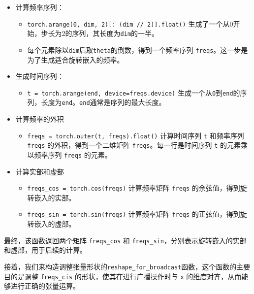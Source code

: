 \documentclass[12pt,a4paper]{book}
\begin{document}
\begin{itemize}
\tightlist
\item
  计算频率序列：

  \begin{itemize}
  \tightlist
  \item
    \texttt{torch.arange(0,\ dim,\ 2){[}:\ (dim\ //\ 2){]}.float()}
    生成了一个从0开始，步长为2的序列，其长度为\texttt{dim}的一半。
  \item
    每个元素除以\texttt{dim}后取\texttt{theta}的倒数，得到一个频率序列
    \texttt{freqs}。这一步是为了生成适合旋转嵌入的频率。
  \end{itemize}
\item
  生成时间序列：

  \begin{itemize}
  \tightlist
  \item
    \texttt{t\ =\ torch.arange(end,\ device=freqs.device)}
    生成一个从\texttt{0}到\texttt{end}的序列，长度为\texttt{end}。\texttt{end}通常是序列的最大长度。
  \end{itemize}
\item
  计算频率的外积

  \begin{itemize}
  \tightlist
  \item
    \texttt{freqs\ =\ torch.outer(t,\ freqs).float()} 计算时间序列
    \texttt{t} 和频率序列 \texttt{freqs} 的外积，得到一个二维矩阵
    \texttt{freqs}。每一行是时间序列 \texttt{t} 的元素乘以频率序列
    \texttt{freqs} 的元素。
  \end{itemize}
\item
  计算实部和虚部

  \begin{itemize}
  \tightlist
  \item
    \texttt{freqs\_cos\ =\ torch.cos(freqs)} 计算频率矩阵 \texttt{freqs}
    的余弦值，得到旋转嵌入的实部。
  \item
    \texttt{freqs\_sin\ =\ torch.sin(freqs)} 计算频率矩阵 \texttt{freqs}
    的正弦值，得到旋转嵌入的虚部。
  \end{itemize}
\end{itemize}

最终，该函数返回两个矩阵 \texttt{freqs\_cos} 和
\texttt{freqs\_sin}，分别表示旋转嵌入的实部和虚部，用于后续的计算。

接着，我们来构造调整张量形状的\texttt{reshape\_for\_broadcast}函数，这个函数的主要目的是调整
\texttt{freqs\_cis} 的形状，使其在进行广播操作时与 \texttt{x}
的维度对齐，从而能够进行正确的张量运算。
\end{document}

